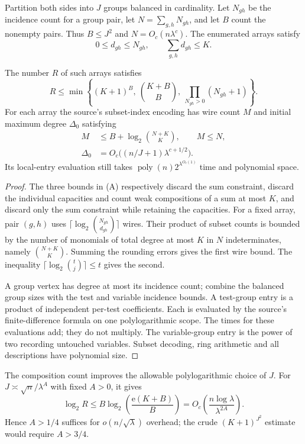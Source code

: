 Partition both sides into $J$ groups balanced in cardinality. Let
$N_{gh}$ be the incidence count for a group pair, let
$N=\sum_{g,h}N_{gh}$, and let $B$ count the nonempty pairs.
Thus $B\le J^2$ and $N=O_c(n\lambda^c)$. The enumerated arrays satisfy
\[
 0\le d_{gh}\le N_{gh},\qquad \sum_{g,h}d_{gh}\le K.
\]

\begin{lemma}
\label{lem:array-budget}
The number $R$ of such arrays satisfies
\[
 R\le\min\left\{(K+1)^B,\ \binom{K+B}{B},\
                   \prod_{N_{gh}>0}(N_{gh}+1)\right\}.
 \tag{A}
\]
For each array the source's subset-index encoding has wire count $M$ and
initial maximum degree $\Delta_0$ satisfying
\begin{align*}
 M&\le B+\log_2\binom{N+K}{K},\qquad M\le N,\\
 \Delta_0&=O_c\bigl((n/J+1)\lambda^{c+1/2}\bigr).
\end{align*}
Its local-entry evaluation still takes
$\operatorname{poly}(n)2^{\lambda^{O_c(1)}}$ time and polynomial space.
\end{lemma}

\begin{proof}
The three bounds in (A) respectively discard the sum constraint, discard
the individual capacities and count weak compositions of a sum at most
$K$, and discard only the sum constraint while retaining the capacities.
For a fixed array, pair $(g,h)$ uses
$\lceil\log_2\binom{N_{gh}}{d_{gh}}\rceil$ wires. Their product of subset
counts is bounded by the number of monomials of total degree at most $K$
in $N$ indeterminates, namely $\binom{N+K}{K}$. Summing the rounding errors
gives the first wire bound. The inequality
$\lceil\log_2\binom{t}{j}\rceil\le t$ gives the second.

A group vertex has degree at most its incidence count; combine the balanced
group sizes with the test and variable incidence bounds. A test-group entry
is a product of independent per-test coefficients. Each is evaluated by the
source's finite-difference formula on one polylogarithmic scope.
The times for these evaluations add; they do not multiply. The
variable-group entry is the power of two recording untouched variables.
Subset decoding, ring arithmetic and all descriptions have polynomial size.
\end{proof}

The composition count improves the allowable polylogarithmic choice of $J$.
For $J\asymp\sqrt n/\lambda^A$ with fixed $A>0$, it gives
\[
 \log_2R
 \le B\log_2\!\left(\frac{\mathrm e(K+B)}B\right)
 =O_c\!\left(\frac{n\log\lambda}{\lambda^{2A}}\right).
\]
Hence $A>1/4$ suffices for $o(n/\sqrt\lambda)$ overhead; the crude
$(K+1)^{J^2}$ estimate would require $A>3/4$.

